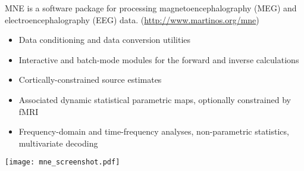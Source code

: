 \begin{multicols}{3}

MNE is a software package for processing magnetoencephalography (MEG) and electroencephalography (EEG) data.
(\url{http://www.martinos.org/mne})
\begin{itemize}[nolistsep,topsep=0em,leftmargin=1pc]
\item Data conditioning and data conversion utilities
\item Interactive and batch-mode modules for the forward and inverse calculations
\item Cortically-constrained source estimates
\item Associated dynamic statistical parametric maps, optionally constrained by fMRI
\item Frequency-domain and time-frequency analyses, non-parametric
  statistics, multivariate decoding
\end{itemize}

\texttt{[image: mne\_screenshot.pdf]}






\end{multicols}
